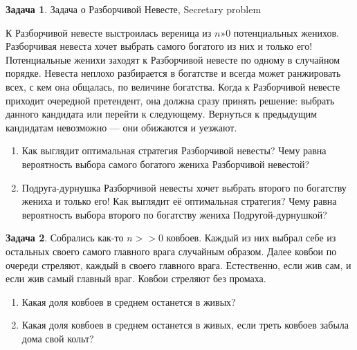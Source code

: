 \documentclass[nobib]{tufte-handout}
\theoremstyle{definition}
\newtheorem{problem}{Задача}
\begin{document}
\begin{problem}
Задача о Разборчивой Невесте, Secretary problem

К Разборчивой невесте выстроилась вереница из $n»0$ потенциальных женихов.   Разборчивая невеста хочет выбрать самого богатого из них и только его! Потенциальные женихи заходят к Разборчивой невесте по одному в случайном порядке. Невеста неплохо разбирается в богатстве и всегда может ранжировать всех, с кем она общалась, по величине богатства. Когда к Разборчивой невесте приходит очередной претендент, она должна сразу принять решение: выбрать данного кандидата или перейти к следующему. Вернуться к предыдущим кандидатам невозможно — они обижаются и уезжают.

\begin{enumerate}
\item Как выглядит оптимальная стратегия Разборчивой невесты? Чему равна вероятность выбора самого богатого жениха Разборчивой невестой?
\item Подруга-дурнушка Разборчивой невесты хочет выбрать второго по богатству жениха и только его!  Как выглядит её оптимальная стратегия? Чему равна вероятность выбора второго по богатству жениха Подругой-дурнушкой?
\end{enumerate}

\end{problem}


\begin{problem}
Собрались как-то $n>>0$ ковбоев. Каждый из них выбрал себе из остальных своего самого главного врага случайным образом. Далее ковбои по очереди стреляют, каждый в своего главного врага. Естественно, если жив сам, и если жив самый главный враг. Ковбои стреляют без промаха.
\begin{enumerate}
\item Какая доля ковбоев в среднем останется в живых?
\item Какая доля ковбоев в среднем останется в живых, если треть ковбоев забыла дома свой кольт?
\end{enumerate}

\end{problem}
\end{document}

